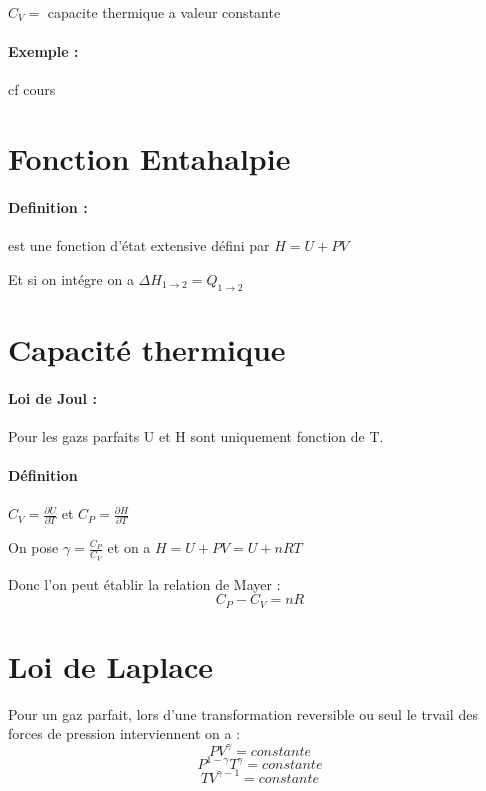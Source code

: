 \documentclass[a4paper,10pt]{report}
\begin{document}
\begin{math}
C_V = 
\end{math}
capacite thermique a valeur constante

\paragraph{Exemple :}cf cours
\section{Fonction Entahalpie}
\paragraph{Definition :}est une fonction d'état extensive défini par 
\begin{math}
 H=U+PV
\end{math}

Et si on intégre on a 
\begin{math}
 \Delta H_{1\rightarrow2}= Q_{1\rightarrow2}
\end{math}
\section{Capacité thermique}
\paragraph{Loi de Joul :}Pour les gazs parfaits U et H sont uniquement fonction de T.
\paragraph{Définition}
\begin{math}
 C_V = \frac{\partial U}{\partial T}
\end{math}
et 
\begin{math}
 C_P = \frac{\partial H}{\partial T}
\end{math}

On pose \begin{math}
         \gamma=\frac{C_P}{C_V}
        \end{math}
et on a \begin{math}
         H=U+PV=U+nRT
        \end{math}

Donc l'on peut établir la relation de Mayer :
\begin{equation}
 C_P-C_V=nR
\end{equation}
\section{Loi de Laplace}
Pour un  gaz parfait, lors d'une transformation reversible ou seul le trvail des forces de pression interviennent on a :
\begin{equation}
 PV^\gamma=constante
\end{equation}
\begin{equation}
P^{1-\gamma}T^{\gamma} = constante 
\end{equation}
\begin{equation}
 TV^{\gamma-1}=constante
\end{equation}
\end{document}
